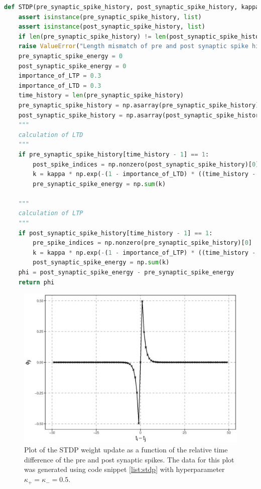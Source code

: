 \begin{lstlisting}[language=Python, caption={Python code for calculating dynamic influence}, label={list:stdp}]
def STDP(pre_synaptic_spike_history, post_synaptic_spike_history, kappa):	
	assert isinstance(pre_synaptic_spike_history, list)
	assert isinstance(post_synaptic_spike_history, list)
	if len(pre_synaptic_spike_history) != len(post_synaptic_spike_history):
	raise ValueError("Length mismatch of pre and post synaptic spike history!!")
	pre_synaptic_spike_energy = 0
	post_synaptic_spike_energy = 0
	importance_of_LTP = 0.3
	importance_of_LTD = 0.3
	time_history = len(pre_synaptic_spike_history)
	pre_synaptic_spike_history = np.asarray(pre_synaptic_spike_history)
	post_synaptic_spike_history = np.asarray(post_synaptic_spike_history)
	"""
	calculation of LTD
	"""
	if pre_synaptic_spike_history[time_history - 1] == 1:
		post_spike_indices = np.nonzero(post_synaptic_spike_history)[0]
		k = kappa * np.exp(-(1 - importance_of_LTD) * ((time_history - 1) - post_spike_indices))
		pre_synaptic_spike_energy = np.sum(k)
	
	"""
	calculation of LTP
	"""
	if post_synaptic_spike_history[time_history - 1] == 1:
		pre_spike_indices = np.nonzero(pre_synaptic_spike_history)[0]
		k = kappa * np.exp(-(1 - importance_of_LTP) * ((time_history - 1) - pre_spike_indices))
		post_synaptic_spike_energy = np.sum(k)
	phi = post_synaptic_spike_energy - pre_synaptic_spike_energy
	return phi
\end{lstlisting}


\begin{figure}
	\centering
	\includegraphics[width=\linewidth]{fig/fmridti/STDP.eps}
	\caption{Plot of the STDP weight update as a function of the relative time difference of the pre and post synaptic spikes. The data for this plot was generated using code snippet \ref{list:stdp} with hyperparameter $\kappa_+=\kappa_-=0.5$.}
	\label{fig:stdp}
\end{figure}



